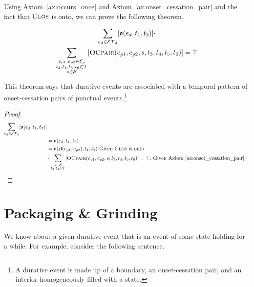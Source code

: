 Using Axiom~\ref{ax:occurs_once} and Axiom~\ref{ax:onset_cessation_pair} and the fact that $\textsc{Clos}$ is onto, we can prove the following theorem.

\begin{theorem}\label{thm:durative_events_temporal_pattern}
	\begin{equation}
		\begin{gathered}
			\sum_{e_d \in \mathcal{ET}_d}[\mathfrak{o}(e_d, t_1, t_2)] \cdot  \\
			\sum_{\substack{e_{p1}, e_{p2} \in \mathcal{E}_p \\ t_3, t_4, t_5, t_6 \in \mathcal{T} \\ s \in \mathcal{S}}}[
				\textsc{OCpair}(e_{p1}, e_{p2}, s, t_3, t_4, t_5, t_6)
			] = \top
		\end{gathered}
	\end{equation}
\end{theorem}

This theorem says that durative events are associated with a temporal pattern of onset-cessation pairs of punctual events.\footnote{A durative event is
	made up of a boundary, an onset-cessation pair, and an interior homogeneously filled with a state.}

\begin{proof}
	\begin{align*}
		\sum_{e_d \in \mathcal{ET}_d}[\mathfrak{o}(e_d, t_1, t_2)]                                                 \\
		 & = \mathfrak{o}(e_d, t_1, t_2)                                                                           \\
		 & = \mathfrak{o}(\mathfrak{cl}(e_{p1}, e_{p2}), t_1, t_2) \ \text{Given} \ \textsc{Clos} \ \text{is onto} \\
		 & \cdot \sum_{\substack{s \in \mathcal{S}                                                                 \\ t_3, t_4 \in \mathcal{T}}}[\textsc{OCpair}(e_{p1}, e_{p2}, s, t_3, t_4, t_5, t_6)]= \top. \ \text{Given Axiom~\ref{ax:onset_cessation_pair}}
	\end{align*}
\end{proof}

\section{Packaging \& Grinding}
We know about a given durative event that is an event of some state holding for a while. For example, consider the following sentence.

